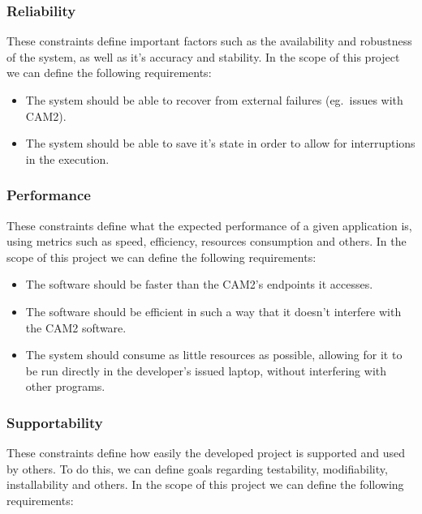 \subsubsection{Reliability}

These constraints define important factors such as the availability and robustness of the system, as well as it's accuracy and stability. In the scope of this project we can define the following requirements:

\begin{itemize}
	\item The system should be able to recover from external failures (eg.\ issues with CAM2\textsuperscript{\textregistered}).
	\item The system should be able to save it's state in order to allow for interruptions in the execution.
\end{itemize}

\subsubsection{Performance}

These constraints define what the expected performance of a given application is, using metrics such as speed, efficiency, resources consumption and others. In the scope of this project we can define the following requirements:

\begin{itemize}
	\item The software should be faster than the CAM2\textsuperscript{\textregistered}'s endpoints it accesses.
	\item The software should be efficient in such a way that it doesn't interfere with the CAM2\textsuperscript{\textregistered} software.
	\item The system should consume as little resources as possible, allowing for it to be run directly in the developer's issued laptop, without interfering with other programs.
\end{itemize}

\subsubsection{Supportability}

These constraints define how easily the developed project is supported and used by others. To do this, we can define goals regarding testability, modifiability, installability and others. In the scope of this project we can define the following requirements:

